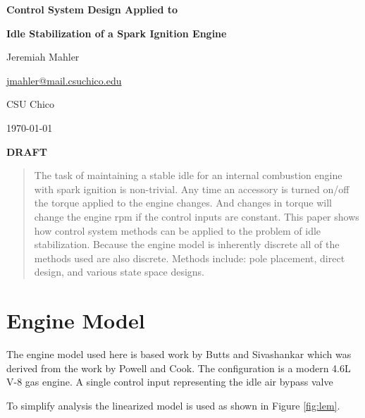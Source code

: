 \documentclass{article}
\begin{document}

\thispagestyle{empty}

\centerline{\Large \textbf{Control System Design Applied to}}
\centerline{\Large \textbf{Idle Stabilization of a Spark Ignition Engine}}
\vspace{0.1in}
\centerline{\normalsize {Jeremiah Mahler}}
\centerline{\small {\href{mailto:jmahler@mail.csuchico.edu}{jmahler@mail.csuchico.edu}} }
\vspace{0.1in}
\centerline{\normalsize {CSU Chico}}
\centerline{\small \today}
\vspace{0.2in}
\centerline{\LARGE \textbf{DRAFT}}
\vspace{0.2in}


\begin{abstract}
\noindent
The task of maintaining a stable idle for an internal combustion
engine with spark ignition is non-trivial.
Any time an accessory is turned on/off the torque applied to
the engine changes.
And changes in torque will change the engine rpm if the control
inputs are constant.
This paper shows how control system methods can be applied to
the problem of idle stabilization.
Because the engine model is inherently discrete all of the methods
used are also discrete.
Methods include: pole placement, direct design, and
various state space designs.

\end{abstract}

\section{Engine Model}

The engine model used here is based work
by Butts and Sivashankar\autocite{532315} which was derived from
the work by Powell and Cook\autocite{4789342}.
The configuration is a modern 4.6L V-8 gas engine.
A single control input representing the idle air bypass valve 

To simplify analysis the linearized model is used as shown in
Figure \ref{fig:lem}.
\end{document}
